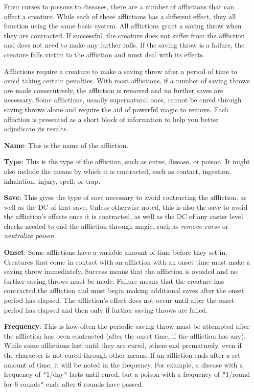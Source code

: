 				
From curses to poisons to diseases, there are a number of afflictions that can affect a creature. While each of these afflictions has a different effect, they all function using the same basic system. All afflictions grant a saving throw when they are contracted. If successful, the creature does not suffer from the affliction and does not need to make any further rolls. If the saving throw is a failure, the creature falls victim to the affliction and must deal with its effects.
				
Afflictions require a creature to make a saving throw after a period of time to avoid taking certain penalties. With most afflictions, if a number of saving throws are made consecutively, the affliction is removed and no further saves are necessary. Some afflictions, usually supernatural ones, cannot be cured through saving throws alone and require the aid of powerful magic to remove. Each affliction is presented as a short block of information to help you better adjudicate its results. 
				
\textbf{Name}: This is the name of the affliction. 
				
\textbf{Type}: This is the type of the affliction, such as curse, disease, or poison. It might also include the means by which it is contracted, such as contact, ingestion, inhalation, injury, spell, or trap.
				
\textbf{Save}: This gives the type of save necessary to avoid contracting the affliction, as well as the DC of that save. Unless otherwise noted, this is also the save to avoid the affliction's effects once it is contracted, as well as the DC of any caster level checks needed to end the affliction through magic, such as \textit{remove curse} or \textit{neutralize poison}.
				
\textbf{Onset}: Some afflictions have a variable amount of time before they set in. Creatures that come in contact with an affliction with an onset time must make a saving throw immediately. Success means that the affliction is avoided and no further saving throws must be made. Failure means that the creature has contracted the affliction and must begin making additional saves after the onset period has elapsed. The affliction's effect does not occur until after the onset period has elapsed and then only if further saving throws are failed.
				
\textbf{Frequency}: This is how often the periodic saving throw must be attempted after the affliction has been contracted (after the onset time, if the affliction has any). While some afflictions last until they are cured, others end prematurely, even if the character is not cured through other means. If an affliction ends after a set amount of time, it will be noted in the frequency. For example, a disease with a frequency of \texttt{{}"{}}1/day\texttt{{}"{}} lasts until cured, but a poison with a frequency of \texttt{{}"{}}1/round for 6 rounds\texttt{{}"{}} ends after 6 rounds have passed.
				
